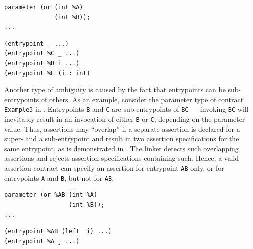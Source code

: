 \vspace{\baselineskip}
\noindent
\begin{minipage}{.4\textwidth}
\begin{lstlisting}[label=lst:ambiguity_parent, numbers=none, language=Michelson, caption=Example2.tz]
parameter (or (int %A)
              (int %B));
...
\end{lstlisting}
\end{minipage}\hfill
\begin{minipage}{.5\textwidth}
\begin{lstlisting}[label=lst:ambiguity_assertion, language=Assertion, caption=Ambiguous assertions for Example2.tz]
(entrypoint _ ...)
(entrypoint %C _ ...)
(entrypoint %D i ...)
(entrypoint %E (i : int)
\end{lstlisting}
\end{minipage}
\vspace{\baselineskip}

Another type of ambiguity is caused by the fact that entrypoints can be sub-entrypoints of others. As an example, consider the parameter type of contract \texttt{Example3} in . Entrypoints \texttt{B} and \texttt{C} are sub-entrypoints of \texttt{BC} --- invoking \texttt{BC} will inevitably result in an invocation of either \texttt{B} or \texttt{C}, depending on the parameter value. Thus, assertions may ``overlap'' if a separate assertion is declared for a super- and a sub-entrypoint and result in two assertion specifications for the same entrypoint, as is demonstrated in . The linker detects such overlapping assertions and rejects assertion specifications containing such. Hence, a valid assertion contract can specify an assertion for entrypoint \texttt{AB} only, or for entrypoints \texttt{A} and \texttt{B}, but not for \texttt{AB}. 

\vspace{\baselineskip}
\noindent
\begin{minipage}{.45\textwidth}
\begin{lstlisting}[label=lst:overlap_parent, numbers=none, language=Michelson, caption=Example3.tz]
parameter (or %AB (int %A)
                  (int %B));
...
\end{lstlisting}
\end{minipage}\hfill
\begin{minipage}{.5\textwidth}
\begin{lstlisting}[label=lst:overlap_assertion, numbers=none, language=Assertion, caption=Example3.tza with overlapping assertions]
(entrypoint %AB (left  i) ...)
(entrypoint %A j ...)
\end{lstlisting}
\end{minipage}
\vspace{\baselineskip}

